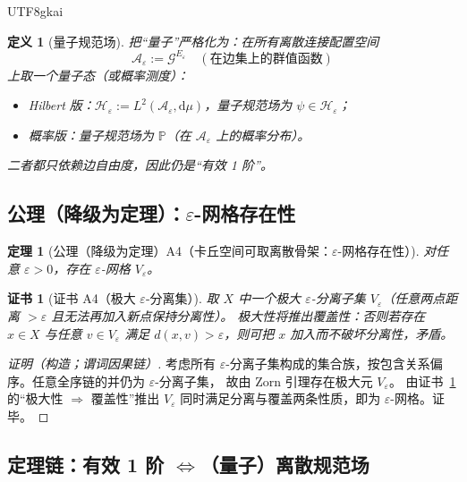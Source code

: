 \documentclass[12pt]{article}
\newtheorem{definition}{定义}[section]
\newtheorem{theorem}{定理}[section]
\newtheorem{Certificate}{证书}[section]
\begin{document}
\begin{CJK*}{UTF8}{gkai}
\begin{definition}[量子规范场]
\label{def:tex27-ch4-d5}
把“量子”严格化为：在所有离散连接配置空间
\[
  \mathcal{A}_\varepsilon:=\mathcal{G}^{E_\varepsilon}
  \quad(\text{在边集上的群值函数})
\]
上取一个量子态（或概率测度）：
\begin{itemize}
  \item Hilbert 版：$\mathcal{H}_\varepsilon:=L^2(\mathcal{A}_\varepsilon,\mathrm{d}\mu)$，量子规范场为 $\psi\in\mathcal{H}
    _\varepsilon$；
  \item 概率版：量子规范场为 $\mathbb{P}$（在 $\mathcal{A}_\varepsilon$ 上的概率分布）。
\end{itemize}
二者都只依赖边自由度，因此仍是“有效 1 阶”。
\end{definition}

\subsection{公理（降级为定理）：\texorpdfstring{$\varepsilon$}{ε}-网格存在性}
\label{subsec:tex27-ch4-axiom}

\begin{theorem}[公理（降级为定理）A4（卡丘空间可取离散骨架：$\varepsilon$-网格存在性）]
\label{thm:tex27-ch4-a4}
对任意 $\varepsilon>0$，存在 $\varepsilon$-网格 $V_\varepsilon$。
\end{theorem}

\begin{Certificate}[证书 A4（极大 $\varepsilon$-分离集）]
\label{cert:tex27-ch4-a4}
取 $X$ 中一个极大 $\varepsilon$-分离子集 $V_\varepsilon$（任意两点距离 $>\varepsilon$ 且无法再加入新点保持分离性）。
极大性将推出覆盖性：否则若存在 $x\in X$ 与任意 $v\in V_\varepsilon$ 满足 $d(x,v)>\varepsilon$，则可把 $x$ 加入而不破坏分离性，矛盾。
\end{Certificate}

\begin{proof}[证明（构造；谓词因果链）]
考虑所有 $\varepsilon$-分离子集构成的集合族，按包含关系偏序。任意全序链的并仍为 $\varepsilon$-分离子集，
故由 Zorn 引理存在极大元 $V_\varepsilon$。
由证书~\ref{cert:tex27-ch4-a4} 的“极大性 $\Rightarrow$ 覆盖性”推出 $V_\varepsilon$ 同时满足分离与覆盖两条性质，即为 $\varepsilon$-网格。证毕。
\end{proof}

\subsection{定理链：有效 1 阶 \texorpdfstring{$\Longleftrightarrow$}{↔}（量子）离散规范场}
\label{subsec:tex27-ch4-theorems}


\end{CJK*}
\end{document}
